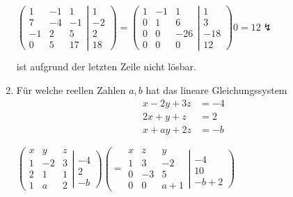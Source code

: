 \documentclass[12pt,a4paper]{scrreprt}
\newcommand{\Lsg}{\textbf{Lsg.:}}
\begin{document}
\begin{enumerate}
$
\left(
\begin{matrix}
1	&	-1	&	1	\\
7	&	-4	&	-1	\\
-1	&	2	&	5	\\
0	&	5	&	17
\end{matrix}
\left|
\begin{matrix}
1	\\
-2	\\
2	\\
18
\end{matrix}
\right)
\right.
=
\left(
\begin{matrix}
1	&	-1	&	1	\\
0	&	1	&	6	\\
0	&	0	&	-26	\\
0	&	0	&	0
\end{matrix}
\left|
\begin{matrix}
1	\\	
3	\\
-18	\\
12
\end{matrix}
\right)
\right.
0=12 \lightning
$

ist aufgrund der letzten Zeile nicht lösbar.

	\item Für welche reellen Zahlen $a,b$ hat das lineare Gleichungssystem	\begin{align*}
					 x-2y+3z &= -4 \\
					2x +y +z &=  2 \\
					x + ay + 2z &= -b			
		 \end{align*}

$
\left(
\begin{matrix}
x	&	y	&	z	\\
1	&	-2	&	3	\\
2	&	1	&	1	\\
1	&	a	&	2
\end{matrix}
\left|
\begin{matrix}
	\\
-4	\\
2	\\
-b
\end{matrix}
\right)
\right.
\left(
=\begin{matrix}
x	&	z	&	y	\\
1	&	3	&	-2	\\
0	&	-3	&	5	\\
0	&	0	&	a+1
\end{matrix}
\left|
\begin{matrix}
	\\
-4	\\
10	\\
-b+2
\end{matrix}
\right)
\right.
$


\end{enumerate}
\end{document}
